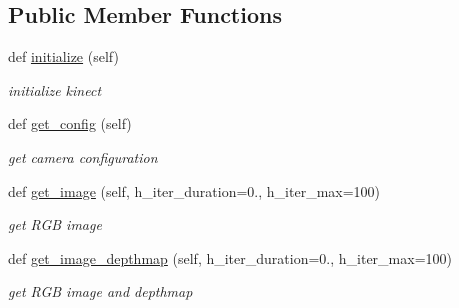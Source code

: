 \subsection*{Public Member Functions}
\begin{DoxyCompactItemize}
\item 
\mbox{\label{classrnb-planning_1_1src_1_1pkg_1_1detector_1_1camera_1_1kinect_1_1_kinect_a475cc2dc07d5565fce9042a606a141ab}} 
def \hyperlink{classrnb-planning_1_1src_1_1pkg_1_1detector_1_1camera_1_1kinect_1_1_kinect_a475cc2dc07d5565fce9042a606a141ab}{initialize} (self)
\begin{DoxyCompactList}\small\item\em initialize kinect \end{DoxyCompactList}\item 
def \hyperlink{classrnb-planning_1_1src_1_1pkg_1_1detector_1_1camera_1_1kinect_1_1_kinect_a4901fe8ab2e68f9e8f10e92040cd5332}{get\+\_\+config} (self)
\begin{DoxyCompactList}\small\item\em get camera configuration \end{DoxyCompactList}\item 
\mbox{\label{classrnb-planning_1_1src_1_1pkg_1_1detector_1_1camera_1_1kinect_1_1_kinect_aed9eecee76ffac3f54221c1e7fc15d40}} 
def \hyperlink{classrnb-planning_1_1src_1_1pkg_1_1detector_1_1camera_1_1kinect_1_1_kinect_aed9eecee76ffac3f54221c1e7fc15d40}{get\+\_\+image} (self, h\+\_\+iter\+\_\+duration=0., h\+\_\+iter\+\_\+max=100)
\begin{DoxyCompactList}\small\item\em get R\+GB image \end{DoxyCompactList}\item 
\mbox{\label{classrnb-planning_1_1src_1_1pkg_1_1detector_1_1camera_1_1kinect_1_1_kinect_ac8a3e439875307d9356c2ed9f66a7324}} 
def \hyperlink{classrnb-planning_1_1src_1_1pkg_1_1detector_1_1camera_1_1kinect_1_1_kinect_ac8a3e439875307d9356c2ed9f66a7324}{get\+\_\+image\+\_\+depthmap} (self, h\+\_\+iter\+\_\+duration=0., h\+\_\+iter\+\_\+max=100)
\begin{DoxyCompactList}\small\item\em get R\+GB image and depthmap \end{DoxyCompactList}\item 

\end{DoxyCompactItemize}
